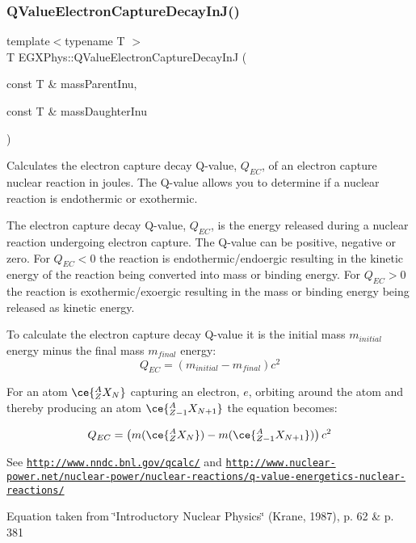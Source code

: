 \subsubsection{\texorpdfstring{Q\+Value\+Electron\+Capture\+Decay\+In\+J()}{QValueElectronCaptureDecayInJ()}}
{\footnotesize\ttfamily template$<$typename T $>$ \\
T E\+G\+X\+Phys\+::\+Q\+Value\+Electron\+Capture\+Decay\+InJ (\begin{DoxyParamCaption}\item[{const T \&}]{mass\+Parent\+Inu,  }\item[{const T \&}]{mass\+Daughter\+Inu }\end{DoxyParamCaption})}



Calculates the electron capture decay Q-\/value, $Q_{EC}$, of an electron capture nuclear reaction in joules. The Q-\/value allows you to determine if a nuclear reaction is endothermic or exothermic. 

The electron capture decay Q-\/value, $Q_{EC}$, is the energy released during a nuclear reaction undergoing electron capture. The Q-\/value can be positive, negative or zero. For $Q_{EC} < 0$ the reaction is endothermic/endoergic resulting in the kinetic energy of the reaction being converted into mass or binding energy. For $Q_{EC} > 0$ the reaction is exothermic/exoergic resulting in the mass or binding energy being released as kinetic energy.

To calculate the electron capture decay Q-\/value it is the initial mass $m_{initial}$ energy minus the final mass $m_{final}$ energy\+: \[Q_{EC} = \left ( m_{initial}-m_{final}\right ) c^2\]

For an atom $\ce{ ^{A}_{Z}X_{N} }$ capturing an electron, $e$, orbiting around the atom and thereby producing an atom $\ce{ ^{A}_{Z-1}X_{N{+1}} }$ the equation becomes\+:

\[Q_{EC} = \left ( m(\ce{ ^{A}_{Z}X_{N} }) - m(\ce{ ^{A}_{Z-1}X_{N{+1}} }) \right ) c^2\]

See \href{http://www.nndc.bnl.gov/qcalc/}{\tt http\+://www.\+nndc.\+bnl.\+gov/qcalc/} and \href{http://www.nuclear-power.net/nuclear-power/nuclear-reactions/q-value-energetics-nuclear-reactions/}{\tt http\+://www.\+nuclear-\/power.\+net/nuclear-\/power/nuclear-\/reactions/q-\/value-\/energetics-\/nuclear-\/reactions/}

Equation taken from \char`\"{}\+Introductory Nuclear Physics\char`\"{} (Krane, 1987), p. 62 \& p. 381


